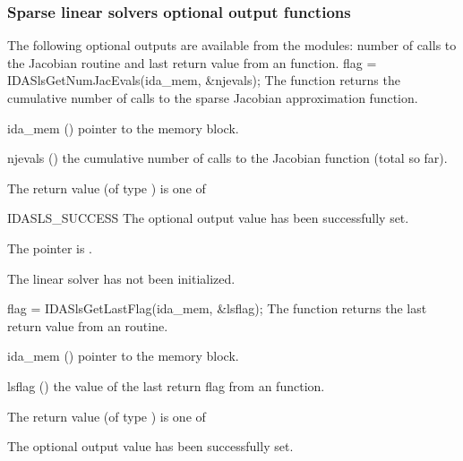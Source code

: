 {\subsubsection{Sparse linear solvers optional output functions}\label{sss:optout_sls}
The following optional outputs are available from the {\idasls} modules:
number of calls to the Jacobian routine and last return value from an
{\idasls} function.
{
  flag = IDASlsGetNumJacEvals(ida\_mem, \&njevals);
}
{
  The function  returns the
  cumulative number of calls to the {\idasls} sparse
  Jacobian approximation function.
}
{
  \begin{args}[njevals]
  \item[ida\_mem] ()
    pointer to the {\ida} memory block.
  \item[njevals] ()
    the cumulative number of calls to the Jacobian function (total so far).
  \end{args}
}
{
  The return value  (of type ) is one of
  \begin{args}
  \item[IDASLS\_SUCCESS] 
    The optional output value has been successfully set.
  \item[\Id{IDASLS\_MEM\_NULL}]
    The  pointer is .
  \item[\Id{IDASLS\_LMEM\_NULL}]
    The {\idasls} linear solver has not been initialized.
  \end{args}
}
{}
{
  flag = IDASlsGetLastFlag(ida\_mem, \&lsflag);
}
{
  The function  returns the
  last return value from an {\idasls} routine. 
}
{
  \begin{args}
  \item[ida\_mem] ()
    pointer to the {\ida} memory block.
  \item[lsflag] ()
    the value of the last return flag from an {\idasls} function.
  \end{args}
}
{
  The return value  (of type ) is one of
  \begin{args}
  \item[\Id{IDASLS\_SUCCESS}] 
    The optional output value has been successfully set.
  \item[\Id{IDASLS\_MEM\_NULL}]

\end{args}}}
